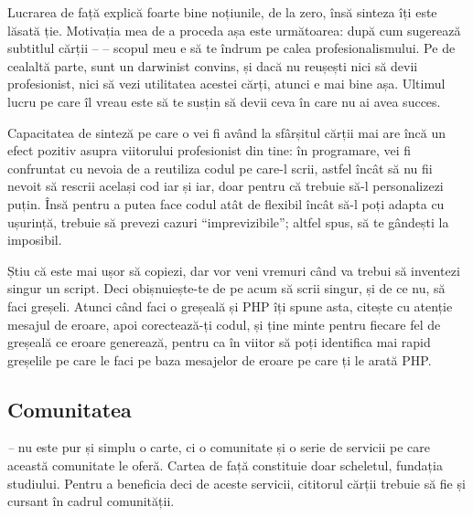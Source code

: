 Lucrarea de față explică foarte bine noțiunile, de la zero, însă sinteza îți
este lăsată ție. Motivația mea de a proceda așa este următoarea: după cum
sugerează subtitlul cărții -- \textit{\thesubtitle} -- scopul meu e să te îndrum
pe calea profesionalismului.  Pe de cealaltă parte, sunt un darwinist convins,
și dacă nu reușești nici să devii profesionist, nici să vezi utilitatea acestei
cărți, atunci e mai bine așa. Ultimul lucru pe care îl vreau este să te susțin
să devii ceva în care nu ai avea succes.

Capacitatea de sinteză pe care o vei fi având la sfârșitul cărții
mai are încă un efect pozitiv asupra viitorului profesionist din tine:
în programare, vei fi confruntat cu nevoia de a reutiliza codul pe care-l scrii, astfel
încât să nu fii nevoit să rescrii același cod iar și iar, doar pentru
că trebuie să-l personalizezi puțin. Însă pentru a putea face
codul atât de flexibil încât să-l poți adapta cu ușurință, trebuie
să prevezi cazuri ``imprevizibile''; altfel spus, să te gândești
la imposibil.


Știu că este mai ușor să copiezi, dar vor veni vremuri când va
trebui să inventezi singur un script. Deci obișnuiește-te de
pe acum să scrii singur, și de ce nu, să faci greșeli. Atunci
când faci o greșeală și PHP îți spune asta, citește cu atenție
mesajul de eroare, apoi corectează-ți codul, și ține minte
pentru fiecare fel de greșeală ce eroare generează, pentru ca
în viitor să poți identifica mai rapid greșelile pe care le faci
pe baza mesajelor de eroare pe care ți le arată PHP.


{}
\subsection*{Comunitatea}
\textit{{\thetitle} -- {\thesubtitle}}
nu este pur și simplu o carte, ci o comunitate și o serie de servicii pe care
această comunitate le oferă. Cartea de față constituie doar scheletul, fundația
studiului. Pentru a beneficia deci de aceste servicii, cititorul cărții
trebuie să fie și cursant în cadrul comunității.

